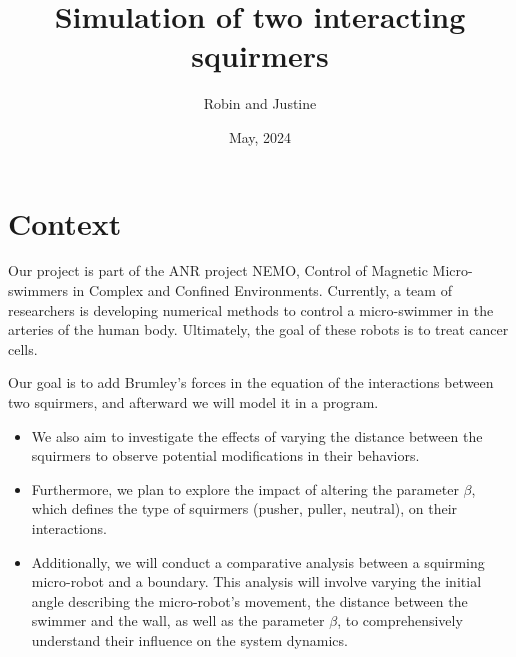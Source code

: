 \documentclass[options]{article}
\begin{document}
\title{Simulation of two interacting squirmers}
\author{Robin and Justine}
\date{May, 2024}
\maketitle

\section{Context}
Our project is part of the ANR project NEMO, Control of Magnetic Micro-swimmers in Complex and Confined Environments.
Currently, a team of researchers is developing numerical methods to control a micro-swimmer in the arteries
of the human body.
Ultimately, the goal of these robots is to treat cancer cells.

\vspace{0.5cm}
Our goal is to add Brumley's forces in the equation of the interactions between two squirmers, 
and afterward we will model it in a program. 
\begin{itemize}
    \item We also aim to investigate the effects of varying the distance between the squirmers to observe
    potential modifications in their behaviors.
    \item Furthermore, we plan to explore the impact of altering the parameter $\beta$, which defines the
    type of squirmers (pusher, puller, neutral), on their interactions.
    \item Additionally, we will conduct a comparative analysis between a squirming micro-robot and a 
    boundary. This analysis will involve varying the initial angle describing the micro-robot's 
    movement, the distance between the swimmer and the wall, as well as the parameter $\beta$, 
    to comprehensively understand their influence on the system dynamics.
\end{itemize}

\newpage
\end{document}
